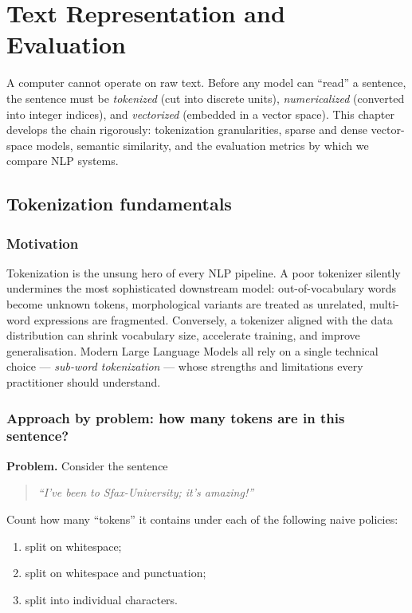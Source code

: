 \chapter{Text Representation and Evaluation}

A computer cannot operate on raw text. Before any model can ``read'' a sentence, the sentence must be \emph{tokenized} (cut into discrete units), \emph{numericalized} (converted into integer indices), and \emph{vectorized} (embedded in a vector space). This chapter develops the chain rigorously: tokenization granularities, sparse and dense vector-space models, semantic similarity, and the evaluation metrics by which we compare NLP systems.

\section{Tokenization fundamentals}

\subsection{Motivation}
Tokenization is the unsung hero of every NLP pipeline. A poor tokenizer silently undermines the most sophisticated downstream model: out-of-vocabulary words become unknown tokens, morphological variants are treated as unrelated, multi-word expressions are fragmented. Conversely, a tokenizer aligned with the data distribution can shrink vocabulary size, accelerate training, and improve generalisation. Modern Large Language Models all rely on a single technical choice --- \emph{sub-word tokenization} --- whose strengths and limitations every practitioner should understand.

\subsection{Approach by problem: how many tokens are in this sentence?}
\textbf{Problem.} Consider the sentence
\begin{quote}
\emph{``I've been to Sfax-University; it's amazing!''}
\end{quote}
Count how many ``tokens'' it contains under each of the following naive policies:
\begin{enumerate}
    \item split on whitespace;
    \item split on whitespace and punctuation;
    \item split into individual characters.
\end{enumerate}

